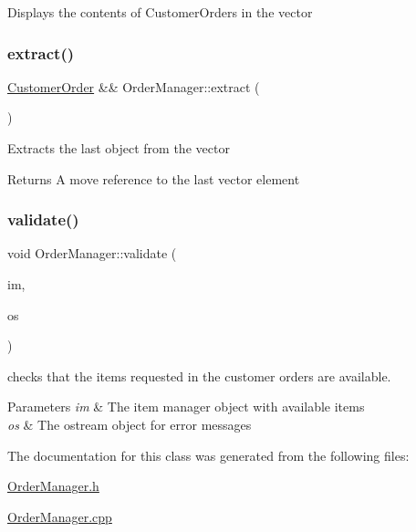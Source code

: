 Displays the contents of Customer\+Orders in the vector \mbox{\label{class_order_manager_a2111b67d23078421bb0c012c25ee87f1}} 
\subsubsection{\texorpdfstring{extract()}{extract()}}
{\footnotesize\ttfamily \mbox{\hyperlink{class_customer_order}{Customer\+Order}} \&\& Order\+Manager\+::extract (\begin{DoxyParamCaption}{ }\end{DoxyParamCaption})}

Extracts the last object from the vector \begin{DoxyReturn}{Returns}
A move reference to the last vector element 
\end{DoxyReturn}
\mbox{\label{class_order_manager_a5469cae831246813134630f8bd85db79}} 
\subsubsection{\texorpdfstring{validate()}{validate()}}
{\footnotesize\ttfamily void Order\+Manager\+::validate (\begin{DoxyParamCaption}\item[{const \mbox{\hyperlink{class_item_manager}{Item\+Manager}} \&}]{im,  }\item[{std\+::ostream \&}]{os }\end{DoxyParamCaption})}

checks that the items requested in the customer orders are available. 
\begin{DoxyParams}{Parameters}
{\em im} & The item manager object with available items \\
\hline
{\em os} & The ostream object for error messages \\
\hline
\end{DoxyParams}


The documentation for this class was generated from the following files\+:\begin{DoxyCompactItemize}
\item 
\mbox{\hyperlink{_order_manager_8h}{Order\+Manager.\+h}}\item 
\mbox{\hyperlink{_order_manager_8cpp}{Order\+Manager.\+cpp}}\end{DoxyCompactItemize}
